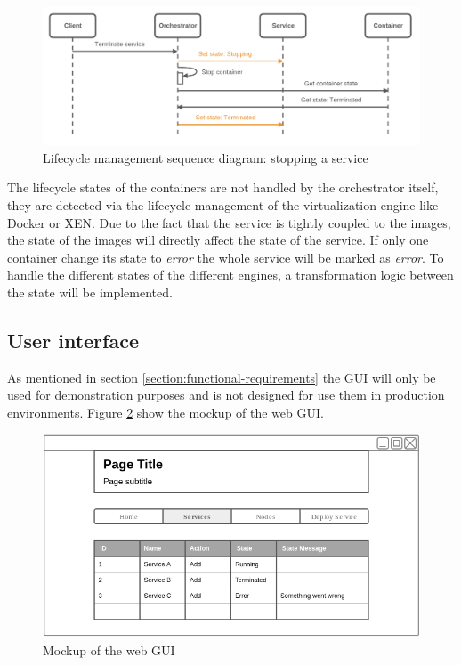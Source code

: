 \begin{figure}[H]
    \centering
    \includegraphics[width=\textwidth]{resources/images/lifecycle_sequence_diagram_stop_service.png}
    \caption[Lifecycle management sequence diagram: stopping a service]{Lifecycle management sequence diagram: stopping a service}
    \label{fig:lifecycle_mgm_squence_diagram_stop_service}
\end{figure}

The lifecycle states of the containers are not handled by the orchestrator itself, they are detected via the lifecycle management of the virtualization engine like Docker or XEN.
Due to the fact that the service is tightly coupled to the images, the state of the images will directly affect the state of the service.
If only one container change its state to \textit{error} the whole service will be marked as \textit{error}.
To handle the different states of the different engines, a transformation logic between the state will be implemented.


\subsection{User interface}
As mentioned in section \ref{section:functional-requirements} the \ac{GUI} will only be used for demonstration purposes and is not designed for use them in production environments.
Figure \ref{fig:gui_mockup} show the mockup of the web \ac{GUI}.

\begin{figure}[H]
    \centering
    \includegraphics[width=\textwidth]{resources/images/gui_prototype.png}
    \caption[Mockup of the web \ac{GUI}]{Mockup of the web \ac{GUI}}
    \label{fig:gui_mockup}
\end{figure}

